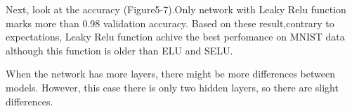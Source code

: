 \documentclass{article}
\begin{document}

Next, look at the accuracy (Figure5-7).Only network with Leaky Relu function marks more than 0.98 validation accuracy.
Based on these result,contrary to expectations, Leaky Relu function achive the best perfomance on MNIST data although this function is older than ELU and SELU.

When the network has more layers, there might be more differences between models. However, this case there is only two hidden layers, so there are slight differences.
\end{document}
